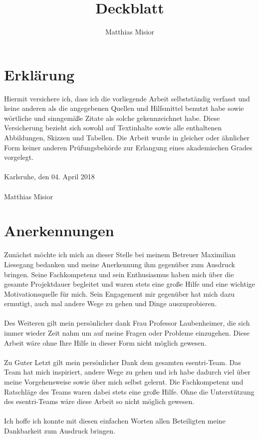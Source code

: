 \documentclass[a4paper,12pt,twoside]{scrartcl}
\title{Deckblatt}
\author{Matthias Misior}
\begin{document}
\thispagestyle{empty}
\section*{Erklärung}
Hiermit versichere ich, dass ich die vorliegende Arbeit selbstständig verfasst und keine anderen als die angegebenen Quellen und Hilfsmittel benutzt habe sowie wörtliche und sinngemäße Zitate als solche gekennzeichnet habe. Diese Versicherung bezieht sich sowohl auf
Textinhalte sowie alle enthaltenen Abbildungen, Skizzen und Tabellen. Die Arbeit wurde in gleicher oder ähnlicher Form keiner anderen Prüfungsbehörde zur Erlangung eines akademischen Grades vorgelegt.
\\\\
Karlsruhe, den 04. April 2018
\\\\
Matthias Misior \noindent\dotfill

\newpage
\thispagestyle{empty}
\section*{Anerkennungen}
Zunächst möchte ich mich an dieser Stelle bei meinem Betreuer Maximilian Liesegang bedanken und meine Anerkennung ihm gegenüber zum Ausdruck bringen. Seine Fachkompetenz und sein Enthusiasmus haben mich über die gesamte Projektdauer begleitet und waren stets eine große Hilfe und eine wichtige Motivationsquelle für mich. Sein Engagement mir gegenüber hat mich dazu ermutigt, auch mal andere Wege zu gehen und Dinge auszuprobieren. 
\\\\
Des Weiteren gilt mein persönlicher dank Frau Professor Laubenheimer, die sich immer wieder Zeit nahm um auf meine Fragen oder Probleme einzugehen. Diese Arbeit wäre ohne Ihre Hilfe in dieser Form nicht möglich gewesen. 
\\\\
Zu Guter Letzt gilt mein persönlicher Dank dem gesamten esentri-Team. Das Team hat mich inspiriert, andere Wege zu gehen und ich habe dadurch viel über meine Vorgehensweise sowie über mich selbst gelernt. Die Fachkompetenz und Ratschläge des Teams waren dabei stets eine große Hilfe. Ohne die Unterstützung des esentri-Teams wäre diese Arbeit so nicht möglich gewesen.
\\\\
Ich hoffe ich konnte mit diesen einfachen Worten allen Beteiligten meine Dankbarkeit zum Ausdruck bringen. 

\newpage
\thispagestyle{empty}
\end{document}
